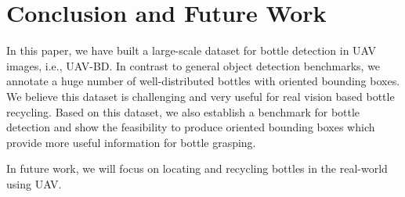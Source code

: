 \section{Conclusion and Future Work}
\label{sec:conclusion}


In this paper, we have built a large-scale dataset for bottle detection in UAV images, i.e., UAV-BD. In contrast to general object detection benchmarks, we annotate a huge number of well-distributed bottles with oriented bounding boxes. We believe this dataset is challenging and very useful for real vision based bottle recycling. Based on this dataset, we also establish a benchmark for bottle detection and show the feasibility to produce oriented bounding boxes which provide more useful information for bottle grasping.

In future work, we will focus on locating and recycling bottles in the real-world using UAV.